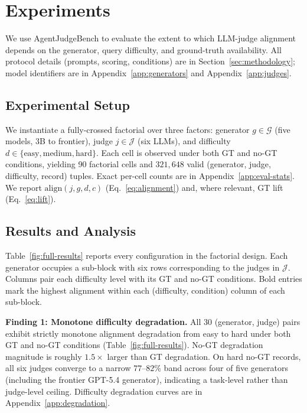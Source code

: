 \section{Experiments}
\label{sec:experiments}

We use AgentJudgeBench to evaluate the extent to which LLM-judge alignment depends on the generator, query difficulty, and ground-truth availability. All protocol details (prompts, scoring, conditions) are in Section~\ref{sec:methodology}; model identifiers are in Appendix~\ref{app:generators} and Appendix~\ref{app:judges}.

\subsection{Experimental Setup}
\label{sec:exp:design}

We instantiate a fully-crossed factorial over three factors: generator $g \in \mathcal{G}$ (five models, 3B to frontier), judge $j \in \mathcal{J}$ (six LLMs), and difficulty $d \in \{\text{easy}, \text{medium}, \text{hard}\}$. Each cell is observed under both GT and no-GT conditions, yielding 90 factorial cells and $321{,}648$ valid (generator, judge, difficulty, record) tuples. Exact per-cell counts are in Appendix~\ref{app:eval-stats}. We report $\mathrm{align}(j, g, d, c)$ (Eq.~\ref{eq:alignment}) and, where relevant, GT lift (Eq.~\ref{eq:lift}).

\subsection{Results and Analysis}
\label{sec:exp:main}

Table~\ref{fig:full-results} reports every configuration in the factorial design. Each generator occupies a sub-block with six rows corresponding to the judges in $\mathcal{J}$. Columns pair each difficulty level with its GT and no-GT conditions. Bold entries mark the highest alignment within each (difficulty, condition) column of each sub-block.

\textbf{Finding 1: Monotone difficulty degradation.} All 30 (generator, judge) pairs exhibit strictly monotone alignment degradation from easy to hard under both GT and no-GT conditions (Table~\ref{fig:full-results}). No-GT degradation magnitude is roughly $1.5\times$ larger than GT degradation. On hard no-GT records, all six judges converge to a narrow $77$--$82\%$ band across four of five generators (including the frontier GPT-5.4 generator), indicating a task-level rather than judge-level ceiling. Difficulty degradation curves are in Appendix~\ref{app:degradation}.

